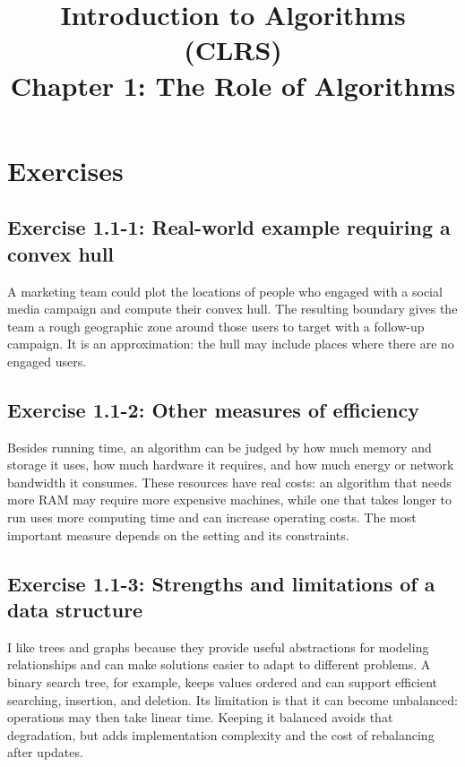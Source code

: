\documentclass[11pt]{article}
\title{Introduction to Algorithms (CLRS)\\Chapter 1: The Role of Algorithms}
\author{}
\date{}
\begin{document}
\maketitle

\section{Exercises}

\subsection*{Exercise 1.1-1: Real-world example requiring a convex hull}

A marketing team could plot the locations of people who engaged with a social
media campaign and compute their convex hull. The resulting boundary gives the
team a rough geographic zone around those users to target with a follow-up
campaign. It is an approximation: the hull may include places where there are
no engaged users.

\subsection*{Exercise 1.1-2: Other measures of efficiency}

Besides running time, an algorithm can be judged by how much memory and storage
it uses, how much hardware it requires, and how much energy or network bandwidth
it consumes. These resources have real costs: an algorithm that needs more RAM
may require more expensive machines, while one that takes longer to run uses
more computing time and can increase operating costs. The most important measure
depends on the setting and its constraints.

\subsection*{Exercise 1.1-3: Strengths and limitations of a data structure}

I like trees and graphs because they provide useful abstractions for modeling
relationships and can make solutions easier to adapt to different problems. A
binary search tree, for example, keeps values ordered and can support efficient
searching, insertion, and deletion. Its limitation is that it can become
unbalanced: operations may then take linear time. Keeping it balanced avoids
that degradation, but adds implementation complexity and the cost of
rebalancing after updates.
\end{document}
